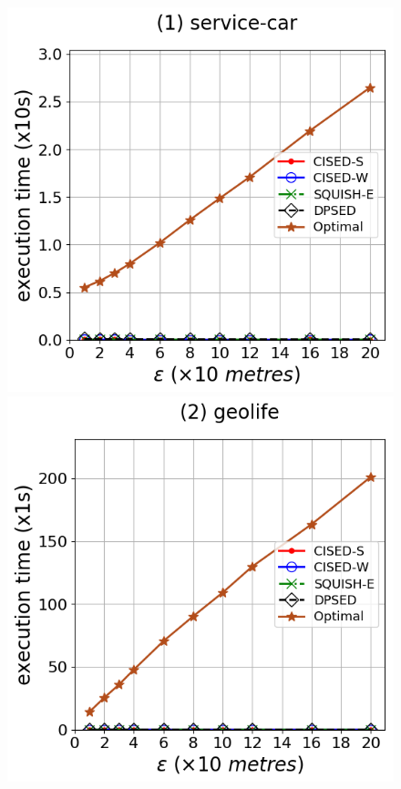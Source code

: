 \begin{figure}[tb!]
\centering
\includegraphics[scale = 0.275]{Figures/Exp-opt-time-epsilon-service.png}\hspace{3ex}
\includegraphics[scale = 0.275]{Figures/Exp-opt-time-epsilon-geolife.png}\hspace{3ex}

\end{figure}

